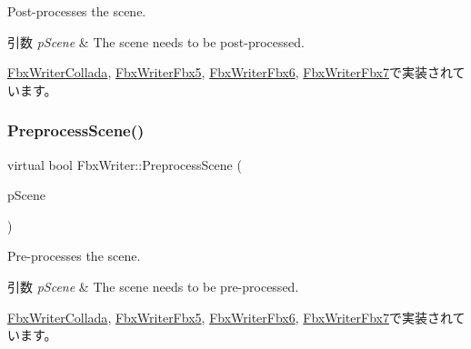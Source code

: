Post-\/processes the scene. 
\begin{DoxyParams}{引数}
{\em p\+Scene} & The scene needs to be post-\/processed. \\
\hline
\end{DoxyParams}


\hyperlink{class_fbx_writer_collada_a3f03c5f945df442ecba81efa7d531c64}{Fbx\+Writer\+Collada}, \hyperlink{class_fbx_writer_fbx5_a471fa8e52601150e6ec1926ef3e4f6b5}{Fbx\+Writer\+Fbx5}, \hyperlink{class_fbx_writer_fbx6_a9a595d04ed83c441705a4be5720e97dc}{Fbx\+Writer\+Fbx6}, \hyperlink{class_fbx_writer_fbx7_aa51d7f58358361aaa30835a32fdb17cf}{Fbx\+Writer\+Fbx7}で実装されています。

\mbox{\label{class_fbx_writer_a0fd62ec785e7108924975591ee8fbf30}} 
\subsubsection{\texorpdfstring{Preprocess\+Scene()}{PreprocessScene()}}
{\footnotesize\ttfamily virtual bool Fbx\+Writer\+::\+Preprocess\+Scene (\begin{DoxyParamCaption}\item[{\hyperlink{class_fbx_scene}{Fbx\+Scene} \&}]{p\+Scene }\end{DoxyParamCaption})\hspace{0.3cm}{\ttfamily [pure virtual]}}

Pre-\/processes the scene. 
\begin{DoxyParams}{引数}
{\em p\+Scene} & The scene needs to be pre-\/processed. \\
\hline
\end{DoxyParams}


\hyperlink{class_fbx_writer_collada_aee5b9934adfdd982e0c33373ddf77121}{Fbx\+Writer\+Collada}, \hyperlink{class_fbx_writer_fbx5_a05b65bf878f38bd34ab9d4bb2e292abf}{Fbx\+Writer\+Fbx5}, \hyperlink{class_fbx_writer_fbx6_a5109088d4869c129427058045efb8808}{Fbx\+Writer\+Fbx6}, \hyperlink{class_fbx_writer_fbx7_a0eac2567b63f4fa72b8d1a6c56d5cb1c}{Fbx\+Writer\+Fbx7}で実装されています。

\mbox{\label{class_fbx_writer_a7f792c49a3550deb39aa994db188c47f}} 
